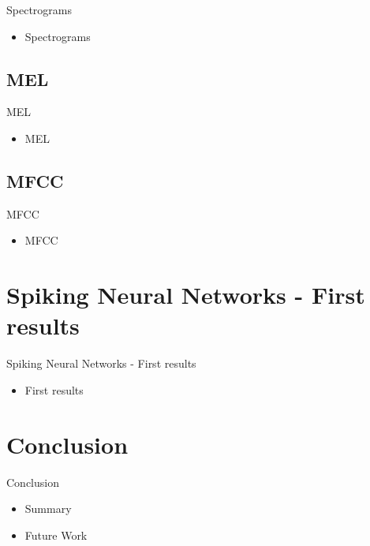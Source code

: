 \documentclass[aspectratio=169, 11pt]{beamer}
\begin{document}
\begin{frame}{Spectrograms}
  \begin{itemize}
    \item Spectrograms
  \end{itemize}
\end{frame}

\subsection{MEL}

\begin{frame}{MEL}
  \begin{itemize}
    \item MEL
  \end{itemize}
\end{frame}

\subsection{MFCC}

\begin{frame}{MFCC}
  \begin{itemize}
    \item MFCC
  \end{itemize}
\end{frame}

\section{Spiking Neural Networks - First results}

\begin{frame}{Spiking Neural Networks - First results}
  \begin{itemize}
    \item First results
  \end{itemize}
\end{frame}

\section{Conclusion}

\begin{frame}{Conclusion}
  \begin{itemize}
    \item Summary
    \item Future Work
  \end{itemize}
\end{frame}
\end{document}
